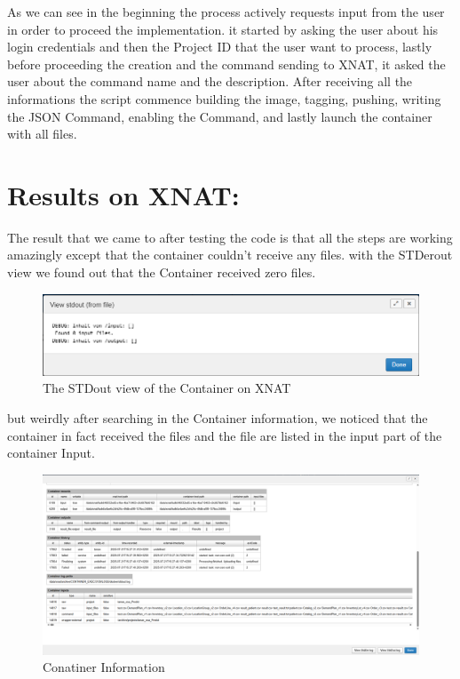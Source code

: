  As we can see in the beginning  the process actively requests input from the user  in order to proceed the implementation. it started by asking the user about his login credentials and then the Project ID that the user want to process, lastly before proceeding the creation and the command sending to XNAT, it asked the user about the command name and the description.
 After receiving  all the  informations the script commence building the image, tagging, pushing, writing the JSON Command, enabling the Command, and lastly launch the container with all files.


 
 \section{Results on XNAT:}
 The result that we came to after testing the code is that all the steps are working amazingly except that the container couldn't receive any files. with the STDerout view we found out that the Container received zero files. 
 
 \begin{figure}
    \centering
    \includegraphics[width=0.8\linewidth]{en/content/STDOUT view.png}
    \caption{The STDout view of the Container on XNAT}
    \label{fig:enter-label}
\end{figure}

but weirdly after searching in the Container information, we noticed that the container in fact received the files and the file are listed in the input part of the container Input. 


 \begin{figure}
    \centering
    \includegraphics[width=0.8\linewidth]{en/content/Container informatin 1.png}
    \caption{Conatiner Information }
    \label{fig:enter-label}
\end{figure}

